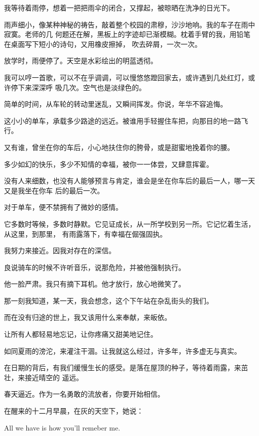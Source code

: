 		我等待着雨停，想着一把把雨伞的闭合，又撑起，被晾晒在洗净的日光下。

		雨声细小，像某种神秘的祷告，敲着整个校园的肃穆，沙沙地响。我的车子在雨中寂寞。老师的几
	何题还在解，黑板上的字迹却已渐模糊。枕着手臂的我，用铅笔在桌面写下短小的诗句，又用橡皮擦掉，
	吹去碎屑，一次一次。

		放学时，雨便停了。天空是水彩绘出的明蓝透彻。

		我可以哼一首歌，可以不在乎调调，可以慢悠悠蹬回家去，或许遇到几处红灯，或许停下来深深呼
	吸几次。空气也是淡绿色的。


		简单的时间，从车轮的转动里迷乱，又瞬间挥发。你说，年华不容追悔。\par
		这小小的单车，承载多少路途的远近。被谁用手轻握住车把，向那目的地一路飞行。\par
		又有谁，曾坐在你的车后，小心地扶住你的胯骨，或是甜蜜地挽着你的腰。\par
		多少如幻的快乐，多少不知情的幸福，被你一一体尝，又肆意挥霍。

		没有人来细数，也没有人能够预言与肯定，谁会是坐在你车后的最后一人，哪一天又是我坐在你车
	后的最后一次。

		对于单车，便不禁拥有了微妙的感情。

		它多数时等候，多数时静默。它见证成长，从一所学校到另一所。它记忆着生活，从这里，到那里，
	有雨露落下，有幸福在倔强固执。

		我努力来接近。因我对存在的深信。\par
		良说骑车的时候不许听音乐，说那危险，并被他强制执行。\par
		他一脸严肃。我只有摘下耳机。他才放行，放心地微笑了。\par
		那一刻我知道，某一天，我会想念，这个下午站在杂乱街头的我们。\par
		而在没有归途的世上，我又该用什么来奉献，来皈依。\par
		让所有人都轻易地忘记，让你疼痛又甜美地记住。\par
		如同夏雨的滂沱，来灌注干涸。让我就这么经过，许多年，许多虚无与真实。

		在日期的背后，有我们缓慢生长的感受。是落在屋顶的种子，等待着雨露，来茁壮，来接近晴空的
	遥远。

		春天逼近。作为一名勇敢的流放者，你要开始相信。

	\endwriting



		在醒来的十二月早晨，在灰的天空下，她说：

		All we have is how you'll remeber me.

